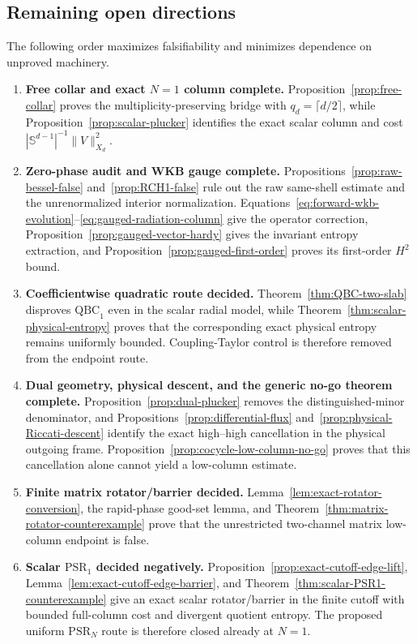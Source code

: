 \documentclass[11pt]{article}
\newcommand{\Sd}{\mathbb S^{d-1}}
\theoremstyle{definition}
\theoremstyle{remark}
\begin{document}
\subsection{Remaining open directions}

The following order maximizes falsifiability and minimizes dependence on unproved machinery.

\begin{enumerate}[label=\textbf{Stage \arabic*.},leftmargin=*]
 \item \textbf{Free collar and exact $N=1$ column complete.}  Proposition~\ref{prop:free-collar} proves the multiplicity-preserving bridge with $q_d=\lceil d/2\rceil$, while Proposition~\ref{prop:scalar-plucker} identifies the exact scalar column and cost $|\Sd|^{-1}\|V\|_{X_d}^2$.
 \item \textbf{Zero-phase audit and WKB gauge complete.}  Propositions~\ref{prop:raw-bessel-false} and~\ref{prop:RCH1-false} rule out the raw same-shell estimate and the unrenormalized interior normalization.  Equations~\eqref{eq:forward-wkb-evolution}--\eqref{eq:gauged-radiation-column} give the operator correction, Proposition~\ref{prop:gauged-vector-hardy} gives the invariant entropy extraction, and Proposition~\ref{prop:gauged-first-order} proves its first-order $H^2$ bound.
 \item \textbf{Coefficientwise quadratic route decided.}  Theorem~\ref{thm:QBC-two-slab} disproves $\mathrm{QBC}_1$ even in the scalar radial model, while Theorem~\ref{thm:scalar-physical-entropy} proves that the corresponding exact physical entropy remains uniformly bounded.  Coupling-Taylor control is therefore removed from the endpoint route.
 \item \textbf{Dual geometry, physical descent, and the generic no-go theorem complete.}  Proposition~\ref{prop:dual-plucker} removes the distinguished-minor denominator, and Propositions~\ref{prop:differential-flux} and~\ref{prop:physical-Riccati-descent} identify the exact high--high cancellation in the physical outgoing frame.  Proposition~\ref{prop:cocycle-low-column-no-go} proves that this cancellation alone cannot yield a low-column estimate.
 \item \textbf{Finite matrix rotator/barrier decided.}  Lemma~\ref{lem:exact-rotator-conversion}, the rapid-phase good-set lemma, and Theorem~\ref{thm:matrix-rotator-counterexample} prove that the unrestricted two-channel matrix low-column endpoint is false.
 \item \textbf{Scalar $\mathrm{PSR}_1$ decided negatively.}  Proposition~\ref{prop:exact-cutoff-edge-lift}, Lemma~\ref{lem:exact-cutoff-edge-barrier}, and Theorem~\ref{thm:scalar-PSR1-counterexample} give an exact scalar rotator/barrier in the finite cutoff with bounded full-column cost and divergent quotient entropy.  The proposed uniform $\mathrm{PSR}_N$ route is therefore closed already at $N=1$.

\end{enumerate}
\end{document}
